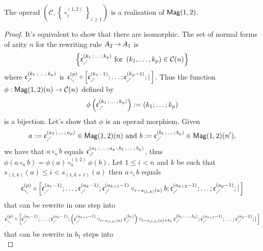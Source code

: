\begin{Proposition} \label{prop:Realisation_Mag_1_2}
The operad 
$\left(\mathcal{C}, \left\{\circ_i^{(1,2)}\right\}_{i \geq 1}\right)$ 
is a realisation of $\mathsf{Mag}(1,2)$.
\end{Proposition}
\begin{proof}
It's equivalent to show that there are isomorphic. The set of normal 
forms of arity $n$ for the rewriting rule $A_2 \operatorname{\to} A_1$ is 
\begin{equation} \label{equ:Normal_forms_A2}
\left\{ \mathfrak{c}^{\left(k_1 \, ; \, \dots \, ; \, k_p\right)}_{\diagup} \text{ for } 
\left(k_1, \dots, k_p\right) \in \mathcal{C}(n) \right\}
\end{equation}
where $\mathfrak{c}^{\left(k_1 \, ; \, \dots \, ; \, k_p\right)}_{\diagup}$ is 
$\mathfrak{c}^{\left(p\right)}_{\diagdown} \circ \left[\mathfrak{c}^{\left(k_1-1\right)}_{\diagup}; \dots ; \mathfrak{c}^{\left(k_p-1\right)}_{\diagup} 
; | \, \right]$.
Thus the function 
$\phi : \mathsf{Mag}(1,2)(n) \rightarrow \mathcal{C}(n)$ defined by
\begin{equation} \label{equ:Morphism_A2}
\phi\left( \mathfrak{c}^{\left(k_1 \, ; \, \dots \, ; \, k_p\right)}_{\diagup} \right) := 
\left(k_1 ; \dots ; k_p  \right)
\end{equation}
is a bijection. Let's show that $\phi$ is an operad morphism. Given 
\begin{equation}
a := \mathfrak{c}^{\left(a_1 \, ; \, \dots \, ; \, a_p\right)}_{\diagup} \in \mathsf{Mag}(1,2)(n) \text{ and }
b := \mathfrak{c}^{\left(b_1 \, ; \, \dots \, ; \, b_q\right)}_{\diagup} \in \mathsf{Mag}(1,2)(n'),
\end{equation}
we have that $a \circ_n b$ equals $\mathfrak{c}^{\left(a_1 \, ; \, \dots \, ; \, a_p
 \, ; \, b_1 \, ; \, \dots \, ; \, b_q\right)}_{\diagup}$, thus 
 $\phi\left(a \circ_n b\right) = \phi\left(a\right) \circ_n^{(1,2)} 
 \phi\left(b\right)$. Let $1 \leq i < n$ and $k$ be such that 
 $s_{(1, k)}(a) \leq i < s_{(1, k+1)}(a)$ then $a \circ_i b$ equals 
\begin{equation} \label{equ:Rewriting_1_Mag_1_2}
\mathfrak{c}^{\left(p\right)}_{\diagdown} \circ \left[\mathfrak{c}^{\left(a_1-1\right)}_{\diagup}; \dots ; \mathfrak{c}^{\left(a_k-1\right)}_{\diagup}; 
\mathfrak{c}^{\left(a_{k+1}-1\right)}_{\diagup}
\circ_{i-s_{(1,k)}(a)} b  ; \mathfrak{c}^{\left(a_{k+2}-1\right)}_{\diagup} ; \dots; \mathfrak{c}^{\left(a_p-1\right)}_{\diagup} ; 
| \, \right]
\end{equation}
that can be rewrite in one step into
\begin{equation}
\mathfrak{c}^{\left(p\right)}_{\diagdown} \circ \left[\mathfrak{c}^{\left(a_1-1\right)}_{\diagup}; \dots ; \mathfrak{c}^{\left(a_k-1\right)}_{\diagup}; \left( 
\mathfrak{c}^{\left(a_{k+1}-1\right)}_{\diagup} \circ_{i-s_{(1,k)}(a)}  \mathfrak{c}^{\left(b_1\right)}_{\diagup} \right) 
\circ_{i-s_{(1,k)}(a)+b_1} \mathfrak{c}^{\left(b_2 \, ; \, \dots \, ; \, b_q\right)}_{\diagup} ; 
\mathfrak{c}^{\left(a_{k+2}-1\right)}_{\diagup} ; \dots; \mathfrak{c}^{\left(a_p-1\right)}_{\diagup} ; | \, \right]
\end{equation}
that can be rewrite in $b_1$ steps into
\begin{equation} \label{equ:Rewriting_2_Mag_1_2}

\end{equation}
\end{proof}
